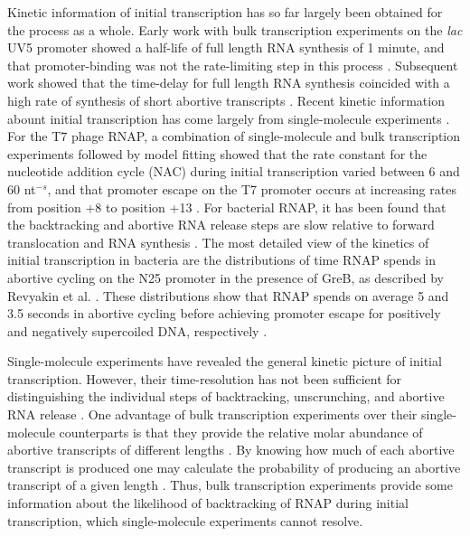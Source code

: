 Kinetic information of initial transcription has so far largely been obtained
for the process as a whole. Early work with bulk transcription experiments on
the \textit{lac} UV5 promoter showed a half-life of full length RNA
synthesis of 1 minute, and that promoter-binding was not the rate-limiting
step in this process \cite{stefano_lac_1979}. Subsequent work showed that the
time-delay for full length RNA synthesis coincided with a high rate of
synthesis of short abortive transcripts \cite{munson_abortive_1981}. Recent
kinetic information abount initial transcription has come largely from
single-molecule experiments \cite{revyakin_abortive_2006, kapanidis_initial_2006,
kapanidis_retention_2005, margeat_direct_2006, tang_real-time_2009}. For the
T7 phage RNAP, a combination of single-molecule and bulk transcription
experiments followed by model fitting showed that the rate constant for the
nucleotide addition cycle (NAC) during initial transcription varied between 6
and 60 nt$^{-s}$, and that promoter escape on the T7 promoter occurs at
increasing rates from position +8 to position +13 \cite{tang_real-time_2009}.
For bacterial RNAP, it has been found that the backtracking and abortive
RNA release steps are slow relative to forward translocation and RNA synthesis
\cite{margeat_direct_2006, revyakin_abortive_2006}. The most detailed view of
the kinetics of initial transcription in bacteria are the
distributions of time RNAP spends in abortive cycling on the N25 promoter in
the presence of GreB, as described by Revyakin et al.
\cite{revyakin_abortive_2006}. These distributions show that RNAP spends on
average 5 and 3.5 seconds in abortive cycling before achieving promoter escape
for positively and negatively supercoiled DNA, respectively
\cite{revyakin_abortive_2006}.

Single-molecule experiments have revealed the general kinetic picture of
initial transcription. However, their time-resolution has not been sufficient
for distinguishing the individual steps of backtracking, unscrunching, and
abortive RNA release \cite{revyakin_abortive_2006, margeat_direct_2006}. One
advantage of bulk transcription experiments over their single-molecule
counterparts is that they provide the relative molar abundance of abortive
transcripts of different lengths \cite{hsu_monitoring_2009}. By knowing how
much of each abortive transcript is produced one may calculate the
probability of producing an abortive transcript of a given length
\cite{hsu_promoter_2002, hsu_quantitative_1996}. Thus, bulk transcription
experiments provide some information about the likelihood of backtracking of
RNAP during initial transcription, which single-molecule experiments cannot
resolve.

